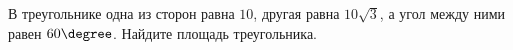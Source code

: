 \begin{ex}
	\begin{condition}
		В треугольнике одна из сторон равна \( 10 \), другая равна \( 10\sqrt{3} \), а угол между ними равен \( 60\degree \). Найдите площадь треугольника.
	\end{condition}
\end{ex}